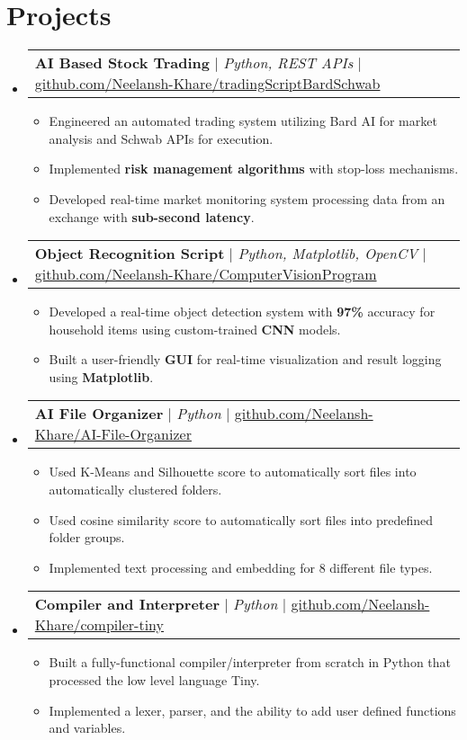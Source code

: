 \documentclass[letterpaper,11pt]{article}
\makeatletter
\newcommand{\resumeItem}[1]{
  \item\small{
    {#1 \vspace{-2pt}}
  }
}
\newcommand{\resumeProjectHeading}[2]{
    \item
    \begin{tabular*}{0.97\textwidth}{l@{\extracolsep{\fill}}r}
      \small#1 & #2 \\
    \end{tabular*}\vspace{-7pt}
}
\newcommand{\resumeSubHeadingListStart}{\begin{itemize}[leftmargin=0.15in, label={}]}
\newcommand{\resumeSubHeadingListEnd}{\end{itemize}}
\newcommand{\resumeItemListStart}{\begin{itemize}}
\newcommand{\resumeItemListEnd}{\end{itemize}\vspace{-5pt}}
\makeatother
\begin{document}
\section{Projects}
\resumeSubHeadingListStart
\resumeProjectHeading
    {\textbf{AI Based Stock Trading} $|$ \emph{Python, REST APIs} $|$ \href{https://github.com/Neelansh-Khare/tradingScriptBardSchwab}{{github.com/Neelansh-Khare/tradingScriptBardSchwab}}}{}
      \resumeItemListStart
        \resumeItem{Engineered an automated trading system utilizing Bard AI for market analysis and Schwab APIs for execution.}
        \resumeItem{Implemented \textbf{risk management algorithms} with stop-loss mechanisms.}
        \resumeItem{Developed real-time market monitoring system processing data from an exchange with \textbf{sub-second latency}.}
      \resumeItemListEnd
\resumeProjectHeading
    {\textbf{Object Recognition Script} $|$ \emph{Python, Matplotlib, OpenCV} $|$ \href{https://github.com/Neelansh-Khare/ComputerVisionProgram}{{github.com/Neelansh-Khare/ComputerVisionProgram}}}{}
      \resumeItemListStart
        \resumeItem{Developed a real-time object detection system with \textbf{97\%} accuracy for household items using custom-trained \textbf{CNN} models.}
        \resumeItem{Built a user-friendly \textbf{GUI} for real-time visualization and result logging using \textbf{Matplotlib}.}
      \resumeItemListEnd
\resumeProjectHeading
    {\textbf{AI File Organizer} $|$ \emph{Python} $|$ \href{https://github.com/Neelansh-Khare/AI-File-Organizer}{{github.com/Neelansh-Khare/AI-File-Organizer}}}{}
      \resumeItemListStart
        \resumeItem{Used K-Means and Silhouette score to automatically sort files into automatically clustered folders.}
        \resumeItem{Used cosine similarity score to automatically sort files into predefined folder groups.}
        \resumeItem{Implemented text processing and embedding for 8 different file types.}
      \resumeItemListEnd
\resumeProjectHeading
    {\textbf{Compiler and Interpreter} $|$ \emph{Python} $|$ \href{https://github.com/Neelansh-Khare/compiler-tiny}{{github.com/Neelansh-Khare/compiler-tiny}}}{}
      \resumeItemListStart
        \resumeItem{Built a fully-functional compiler/interpreter from scratch in Python that processed the low level language Tiny.}
        \resumeItem{Implemented a lexer, parser, and the ability to add user defined functions and variables.}
      \resumeItemListEnd

\resumeSubHeadingListEnd


\end{document}
